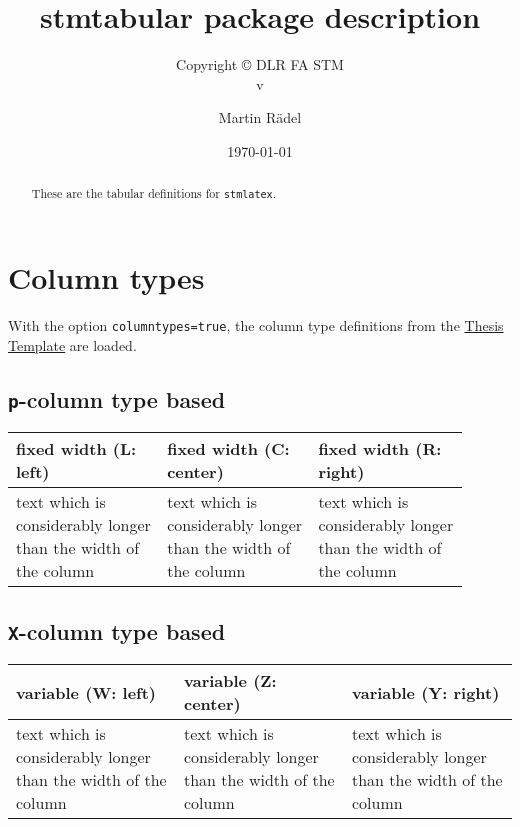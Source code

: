 \documentclass[%
  type=article,%
  layout=koma,%
  date=true,%
  hyperref=true,%
  listings=true,%
  math=true,%
]{stmtext}
\author{Martin R\"{a}del}
\title{stmtabular package description}
\subtitle{Copyright \copyright{} \the\year{} DLR FA STM\\v\formatdate[versiondatestyle]{\DTMToday}}
\date{\today}
\begin{document}
\maketitle

\begin{abstract}
These are the tabular definitions for \texttt{stmlatex}.
\end{abstract}

\tableofcontents

\section{Column types}

With the option \texttt{columntypes=true}, the column type definitions from the \href{http://www.matthiaspospiech.de/files/latex/vorlagen/thesis/TemplateDocumentation.pdf#subsection.7.4.12}{Thesis Template} are loaded.

\subsection{\protect\texttt{p}-column type based}

\begin{table}[htbp]
\begin{tabular}{L{0.3\linewidth}C{0.3\linewidth}R{0.3\linewidth}}
\toprule
fixed width (L: left)   &
fixed width (C: center) &
fixed width (R: right)  \\
\midrule
%
text which is considerably longer than the width of the column &
text which is considerably longer than the width of the column &
text which is considerably longer than the width of the column \\
\bottomrule
\end{tabular}
\end{table}

\subsection{\protect\texttt{X}-column type based}

\begin{table}[htbp]
\begin{tabularx}{\textwidth}{WZY}
\toprule
variable (W: left)   &
variable (Z: center) &
variable (Y: right)  \\
\midrule
%
text which is considerably longer than the width of the column &
text which is considerably longer than the width of the column &
text which is considerably longer than the width of the column \\
\bottomrule
\end{tabularx}
\end{table}
\end{document}
